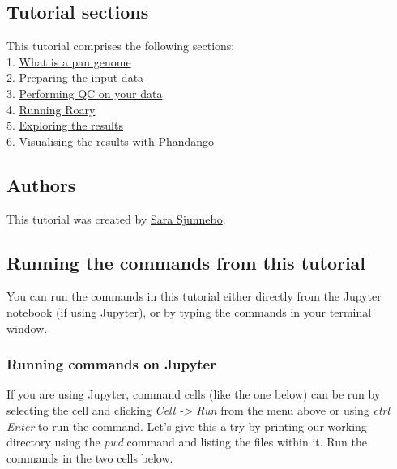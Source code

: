 \documentclass[11pt]{article}
\begin{document}
\hypertarget{tutorial-sections}{%
\subsection{Tutorial sections}\label{tutorial-sections}}

This tutorial comprises the following sections:\\
1. \href{pan_genome.ipynb}{What is a pan genome}\\
2. \href{prepare_data.ipynb}{Preparing the input data}\\
3. \href{qc.ipynb}{Performing QC on your data}\\
4. \href{run_roary.ipynb}{Running Roary}\\
5. \href{results.ipynb}{Exploring the results}\\
6. \href{phandango.ipynb}{Visualising the results with Phandango}

\hypertarget{authors}{%
\subsection{Authors}\label{authors}}

This tutorial was created by \href{https://github.com/ssjunnebo}{Sara
Sjunnebo}.

\hypertarget{running-the-commands-from-this-tutorial}{%
\subsection{Running the commands from this
tutorial}\label{running-the-commands-from-this-tutorial}}

You can run the commands in this tutorial either directly from the
Jupyter notebook (if using Jupyter), or by typing the commands in your
terminal window.

\hypertarget{running-commands-on-jupyter}{%
\subsubsection{Running commands on
Jupyter}\label{running-commands-on-jupyter}}

If you are using Jupyter, command cells (like the one below) can be run
by selecting the cell and clicking \textit{Cell -\textgreater{} Run} from
the menu above or using \textit{ctrl Enter} to run the command. Let's give
this a try by printing our working directory using the \textit{pwd}
command and listing the files within it. Run the commands in the two
cells below.
\end{document}
